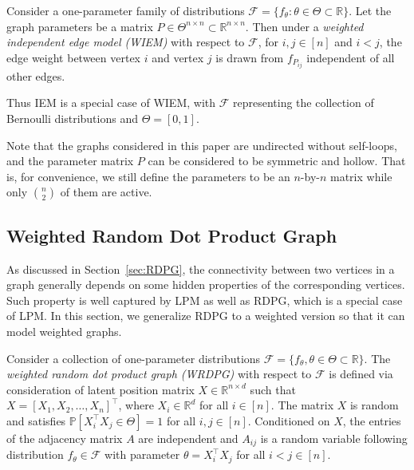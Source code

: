 \begin{definition} 
\label{def:WIEM}
Consider a one-parameter family of distributions $\mathcal{F} = \{ f_{\theta} : \theta \in \Theta \subset \mathbb{R} \}$. Let the graph parameters be a matrix $P \in \Theta^{n \times n} \subset \mathbb{R}^{n \times n}$.
Then under a {\em{weighted independent edge model} (WIEM)} with respect to $\mathcal{F}$, for $i, j \in [n]$ and $i < j$, the edge weight between vertex $i$ and vertex $j$ is drawn from $f_{P_{ij}}$ independent of all other edges.
\end{definition}

Thus IEM is a special case of WIEM, with $\mathcal{F}$ representing the collection of Bernoulli distributions and $\Theta = [0, 1]$.

Note that the graphs considered in this paper are undirected without self-loops, and the parameter matrix $P$ can be considered to be symmetric and hollow. That is, for convenience, we still define the parameters to be an $n$-by-$n$ matrix while only $n \choose 2$ of them are active.



\subsection{Weighted Random Dot Product Graph}
\label{sec:WRDPG}

As discussed in Section~\ref{sec:RDPG}, the connectivity between two vertices in a graph generally depends on some hidden properties of the corresponding vertices. Such property is well captured by LPM as well as RDPG, which is a special case of LPM. In this section, we generalize RDPG to a weighted version so that it can model weighted graphs. 

\begin{definition}
Consider a collection of one-parameter distributions $\mathcal{F} = \{ f_{\theta}, \theta \in \Theta \subset \mathbb{R} \}$. The {\em{weighted random dot product graph (WRDPG)}} with respect to $\mathcal{F}$ is defined via consideration of latent position matrix $X \in \mathbb{R}^{n \times d}$ such that $X = [X_1, X_2, \dotsc, X_n]^{\top}$, where $X_i \in \mathbb{R}^d$ for all $i \in [n]$. The matrix $X$ is random and satisfies $\mathbb{P}\left[ X_i^{\top} X_j \in \Theta \right] = 1$ for all $i, j \in [n]$. Conditioned on $X$, the entries of the adjacency matrix $A$ are independent and $A_{ij}$ is a random variable following distribution $f_{\theta} \in \mathcal{F}$ with parameter $\theta = X_i^{\top} X_j $ for all $i < j \in [n]$.
\end{definition}

